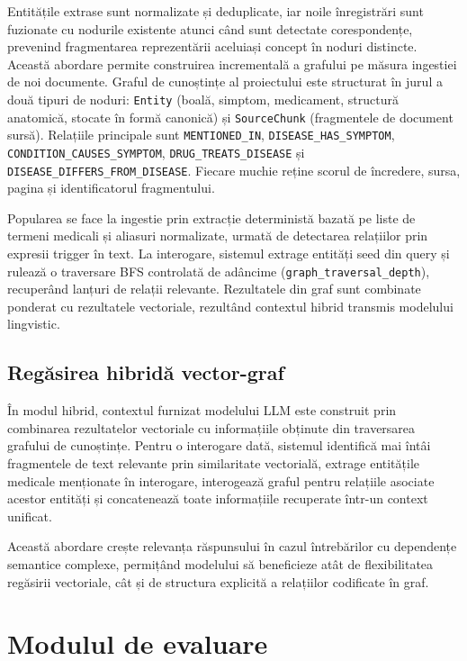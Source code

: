 \documentclass[12pt, a4paper, oneside, romanian]{teza-upb}
\begin{document}
Entitățile extrase sunt normalizate și deduplicate, iar noile înregistrări sunt fuzionate cu nodurile existente atunci când sunt detectate corespondențe, prevenind fragmentarea reprezentării aceluiași concept în noduri distincte. Această abordare permite construirea incrementală a grafului pe măsura ingestiei de noi documente.
Graful de cunoștințe al proiectului este structurat în jurul a două tipuri de noduri: \texttt{Entity} (boală, simptom, medicament, structură anatomică, stocate în formă canonică) și \texttt{SourceChunk} (fragmentele de document sursă). Relațiile principale sunt \texttt{MENTIONED\_IN}, \texttt{DISEASE\_HAS\_SYMPTOM}, \texttt{CONDITION\_CAUSES\_SYMPTOM}, \texttt{DRUG\_TREATS\_DISEASE} și \texttt{DISEASE\_DIFFERS\_FROM\_DISEASE}. Fiecare muchie reține scorul de încredere, sursa, pagina și identificatorul fragmentului.

Popularea se face la ingestie prin extracție deterministă bazată pe liste de termeni medicali și aliasuri normalizate, urmată de detectarea relațiilor prin expresii trigger în text. La interogare, sistemul extrage entități seed din query și rulează o traversare BFS controlată de adâncime (\texttt{graph\_traversal\_depth}), recuperând lanțuri de relații relevante. Rezultatele din graf sunt combinate ponderat cu rezultatele vectoriale, rezultând contextul hibrid transmis modelului lingvistic.

\subsection{Regăsirea hibridă vector-graf}

În modul hibrid, contextul furnizat modelului LLM este construit prin combinarea rezultatelor vectoriale cu informațiile obținute din traversarea grafului de cunoștințe. Pentru o interogare dată, sistemul identifică mai întâi fragmentele de text relevante prin similaritate vectorială, extrage entitățile medicale menționate în interogare, interogează graful pentru relațiile asociate acestor entități și concatenează toate informațiile recuperate într-un context unificat.

Această abordare crește relevanța răspunsului în cazul întrebărilor cu dependențe semantice complexe, permițând modelului să beneficieze atât de flexibilitatea regăsirii vectoriale, cât și de structura explicită a relațiilor codificate în graf.

\section{Modulul de evaluare}
\label{sec:evaluare}
\end{document}
